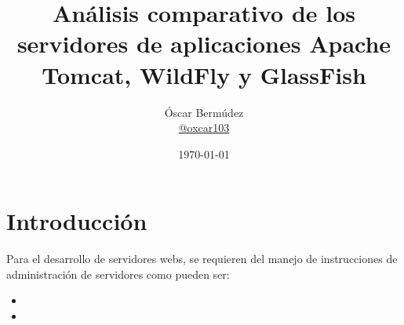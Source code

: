 \documentclass[compress, aspectratio=169]{beamer} %
\title[Análisis de TC, WF y GF]{Análisis comparativo de los servidores de aplicaciones
Apache Tomcat, WildFly y GlassFish} %
\author[Óscar Bermúdez]{
	Óscar Bermúdez\\	
	\href{http://www.github.com/oxcar103}{@oxcar103}
} %
\institute[UGR] %
{
  Universidad de Granada \\ %
}
\date{\today} %
\begin{document}
\begin{frame}
	\titlepage %
\end{frame}


 

\section{Introducción}
	\begin{frame}
		Para el desarrollo de servidores webs, se requieren del manejo de instrucciones de administración
		de servidores como pueden ser:
		
		\begin{itemize}
			\item {}
			

			\item {}
			
			

\end{itemize}
\end{frame}
\end{document}

